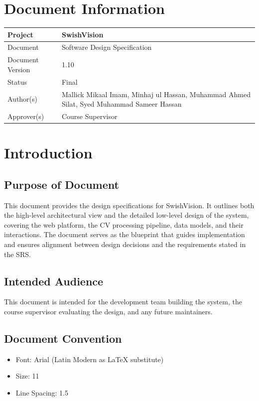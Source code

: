﻿\documentclass[11pt,a4paper]{article}
\begin{document}
\section*{Document Information}
\begin{tabular}{|L{4cm}|L{10cm}|}
\hline
Project & SwishVision \\ \hline
Document & Software Design Specification \\ \hline
Document Version & 1.10 \\ \hline
Status & Final \\ \hline
Author(s) & Mallick Mikaal Imam, Minhaj ul Hassan, Muhammad Ahmed Silat, Syed Muhammad Sameer Hassan \\ \hline
Approver(s) & Course Supervisor \\ \hline
\end{tabular}

\newpage
\tableofcontents
\newpage

\section{Introduction}

\subsection{Purpose of Document}
This document provides the design specifications for SwishVision. It outlines both the high-level architectural view and the detailed low-level design of the system, covering the web platform, the CV processing pipeline, data models, and their interactions. The document serves as the blueprint that guides implementation and ensures alignment between design decisions and the requirements stated in the SRS.

\subsection{Intended Audience}
This document is intended for the development team building the system, the course supervisor evaluating the design, and any future maintainers.

\subsection{Document Convention}
\begin{itemize}[leftmargin=*]
    \item Font: Arial (Latin Modern as LaTeX substitute)
    \item Size: 11
    \item Line Spacing: 1.5
\end{itemize}
\end{document}
